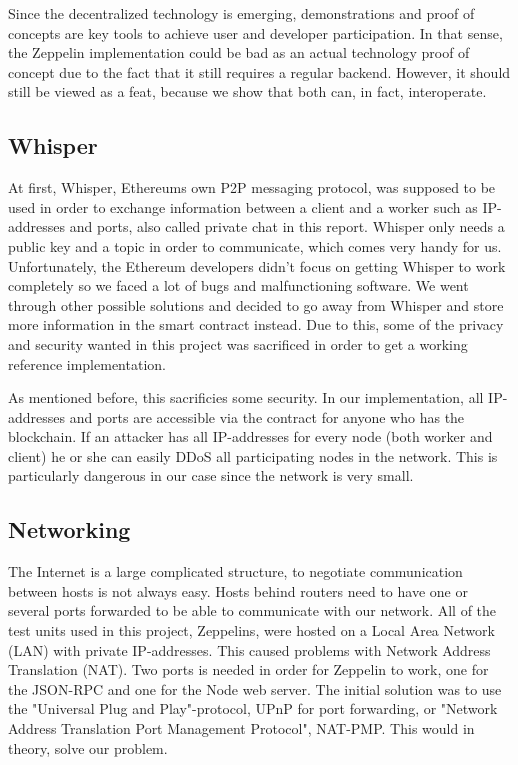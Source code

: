 Since the decentralized technology is emerging, demonstrations and proof of concepts are key tools to achieve user and developer participation. In that sense, the Zeppelin implementation could be bad as an actual technology proof of concept due to the fact that it still requires a regular backend. However, it should still be viewed as a feat, because we show that both can, in fact, interoperate.

\subsection{Whisper}
At first, Whisper, Ethereums own P2P messaging protocol, was supposed to be used in order to exchange information between a client and a worker such as IP-addresses and ports, also called private chat in this report. Whisper only needs a public key and a topic in order to communicate, which comes very handy for us. Unfortunately, the Ethereum developers didn't focus on getting Whisper to work completely so we faced a lot of bugs and malfunctioning software. We went through other possible solutions and decided to go away from Whisper and store more information in the smart contract instead. Due to this, some of the privacy and security wanted in this project was sacrificed in order to get a working reference implementation. 

As mentioned before, this sacrificies some security. In our implementation, all IP-addresses and ports are accessible via the contract for anyone who has the blockchain. If an attacker has all IP-addresses for every node (both worker and client) he or she can easily DDoS all participating nodes in the network. This is particularly dangerous in our case since the network is very small. 

\subsection{Networking}
The Internet is a large complicated structure, to negotiate communication between hosts is not always easy. Hosts behind routers need to have one or several ports forwarded to be able to communicate with our network. All of the test units used in this project, Zeppelins, were hosted on a Local Area Network (LAN) with private IP-addresses. This caused problems with Network Address Translation (NAT). Two ports is needed in order for Zeppelin to work, one for the JSON-RPC and one for the Node web server. The initial solution was to use the "Universal Plug and Play"-protocol, UPnP for port forwarding, or "Network Address Translation Port Management Protocol", NAT-PMP. This would in theory, solve our problem. 

